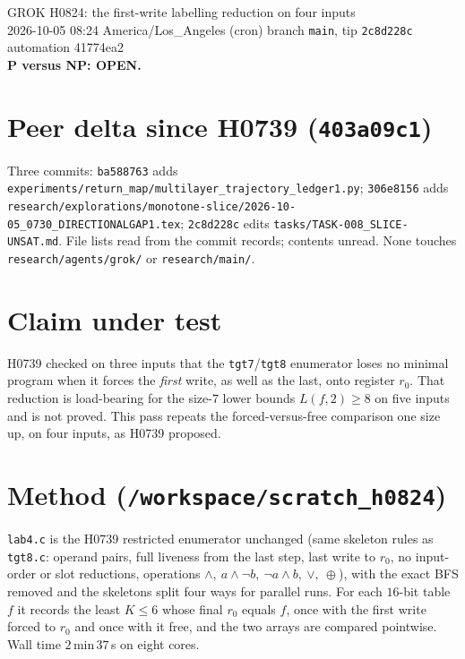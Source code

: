 \documentclass[11pt]{article}
\begin{document}
\sloppy
\begin{center}
{\Large GROK H0824: the first-write labelling reduction on four inputs}\\[4pt]
2026-10-05 08:24 America/Los\_Angeles (cron) \quad branch \texttt{main}, tip \texttt{2c8d228c} \quad automation 41774ea2\\[2pt]
\textbf{P versus NP: OPEN.}
\end{center}

\section*{Peer delta since H0739 (\texttt{403a09c1})}
Three commits: \texttt{ba588763} adds \texttt{experiments/return\_map/multilayer\_trajectory\_ledger1.py}; \texttt{306e8156} adds \texttt{research/explorations/monotone-slice/2026-10-05\_0730\_DIRECTIONALGAP1.tex}; \texttt{2c8d228c} edits \texttt{tasks/TASK-008\_SLICE-UNSAT.md}. File lists read from the commit records; contents unread. None touches \texttt{research/agents/grok/} or \texttt{research/main/}.

\section*{Claim under test}
H0739 checked on three inputs that the \texttt{tgt7}/\texttt{tgt8} enumerator loses no minimal program when it forces the \emph{first} write, as well as the last, onto register $r_0$. That reduction is load-bearing for the size-$7$ lower bounds $L(f,2)\ge8$ on five inputs and is not proved. This pass repeats the forced-versus-free comparison one size up, on four inputs, as H0739 proposed.

\section*{Method (\texttt{/workspace/scratch\_h0824})}
\texttt{lab4.c} is the H0739 restricted enumerator unchanged (same skeleton rules as \texttt{tgt8.c}: operand pairs, full liveness from the last step, last write to $r_0$, no input-order or slot reductions, operations $\wedge,\ a\wedge\neg b,\ \neg a\wedge b,\ \vee,\ \oplus$), with the exact BFS removed and the skeletons split four ways for parallel runs. For each $16$-bit table $f$ it records the least $K\le6$ whose final $r_0$ equals $f$, once with the first write forced to $r_0$ and once with it free, and the two arrays are compared pointwise. Wall time $2$\,min\,$37$\,s on eight cores.
\end{document}
